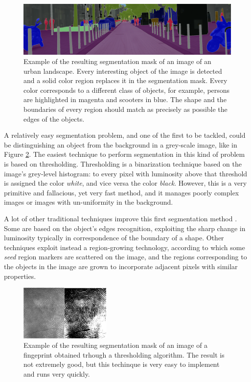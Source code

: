 \documentclass[12pt,a4paper]{report}
\begin{document}
\begin{figure}
    \centering
    \includegraphics[width = \textwidth]{images/seg_example}
    \caption{Example of the resulting segmentation mask of an image of an urban landscape. Every interesting object of the image is detected and a solid color region replaces it in the segmentation mask. Every color corresponds to a different class of objects, for example, persons are highlighted in magenta and scooters in blue. The shape and the boundaries of every region should match as precisely as possible the edges of the objects.}
    \label{fig:seg_example}
\end{figure}

A relatively easy segmentation problem, and one of the first to be tackled, could be distinguishing an object from the background in a grey-scale image, like in Figure \ref{fig:fing_prints}. The easiest technique to perform segmentation in this kind of problem is based on thresholding. Thresholding is a binarization technique based on the image's grey-level histogram: to every pixel with luminosity above that threshold is assigned the color \textit{white}, and vice versa the color \textit{black}. However, this is a very primitive and fallacious, yet very fast method, and it manages poorly complex images or images with un-uniformity in the background.

A lot of other traditional techniques improve this first segmentation method \cite{Chouhan2018}. Some are based on the object's edges recognition, exploiting the sharp change in luminosity typically in correspondence of the boundary of a shape. Other techniques exploit instead a region-growing technology, according to which some \textit{seed} region markers are scattered on the image, and the regions corresponding to the objects in the image are grown to incorporate adjacent pixels with similar properties.

\begin{figure}
    \centering
    \includegraphics[width = 0.4\textwidth]{images/fingerprints}
    \caption{Example of the resulting segmentation mask of an image of a fingeprint obtained trhough a thresholding algorithm. The result is not extremely good, but this techinque is very easy to implement and runs very quickly.}
    \label{fig:fing_prints}
\end{figure}
\end{document}
